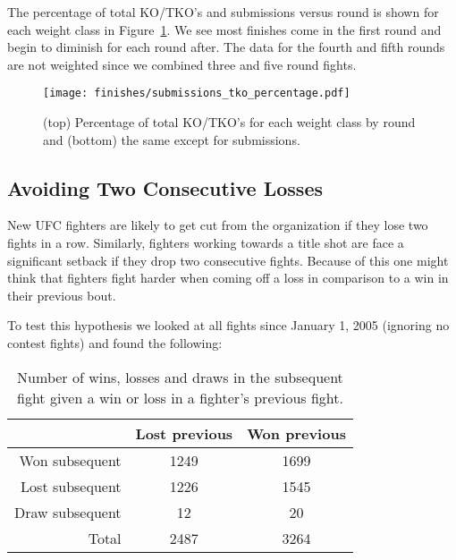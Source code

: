 The percentage of total KO/TKO's and submissions versus
round is shown for each weight class in
Figure~\ref{submissions_tko_percentage}. We see most
finishes come in the first round and begin to diminish
for each round after. The data for the fourth and fifth
rounds are not weighted since we combined
three and five round fights.

\begin{figure}[h]
\begin{center}
\texttt{[image: finishes/submissions\_tko\_percentage.pdf]}
\caption{(top) Percentage of total KO/TKO's for each
weight class by round and (bottom) the same except for submissions.}
\label{submissions_tko_percentage}
\end{center}
\end{figure}


\clearpage
\subsection*{Avoiding Two Consecutive Losses}

New UFC fighters are likely to get cut from the organization if they lose two
fights in a row. Similarly, fighters working towards a title shot are
face a significant setback if they drop two consecutive fights. Because of this
one might think that fighters fight harder when coming off a loss in
comparison to a win in their previous bout.

To test this hypothesis we looked at all fights since January 1, 2005 (ignoring no contest fights) and found
the following:

\begin{center}
\begin{table}[h]
\begin{tabular}{r|cc}
  \toprule
  & Lost previous & Won previous \\
  \hline
  Won subsequent & 1249 & 1699 \\
  Lost subsequent & 1226 & 1545 \\
  Draw subsequent & 12 & 20 \\
  \hline
  Total & 2487 & 3264 \\
  \bottomrule
\end{tabular}
\caption{Number of wins, losses and draws in the subsequent fight given a win or loss in a fighter's previous fight.}
\label{table_avoiding_two_losses}
\end{table}
\end{center}

